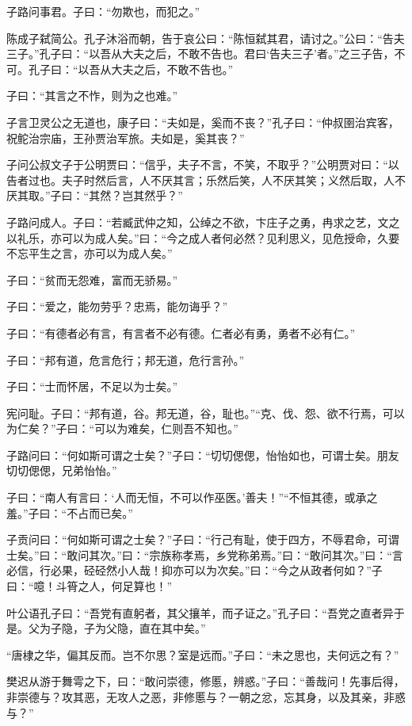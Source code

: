 \documentclass[a5paper]{ctexbook}
\begin{document}
    子路问事君。子曰：“勿欺也，而犯之。”

    陈成子弑简公。孔子沐浴而朝，告于哀公曰：“陈恒弑其君，请讨之。”公曰：“告夫三子。”孔子曰：“以吾从大夫之后，不敢不告也。君曰‘告夫三子’者。”之三子告，不可。孔子曰：“以吾从大夫之后，不敢不告也。”

    子曰：“其言之不怍，则为之也难。”

    子言卫灵公之无道也，康子曰：“夫如是，奚而不丧？”孔子曰：“仲叔圉治宾客，祝𬶍治宗庙，王孙贾治军旅。夫如是，奚其丧？”

    子问公叔文子于公明贾曰：“信乎，夫子不言，不笑，不取乎？”公明贾对曰：“以告者过也。夫子时然后言，人不厌其言；乐然后笑，人不厌其笑；义然后取，人不厌其取。”子曰：“其然？岂其然乎？”

    子路问成人。子曰：“若臧武仲之知，公绰之不欲，卞庄子之勇，冉求之艺，文之以礼乐，亦可以为成人矣。”曰：“今之成人者何必然？见利思义，见危授命，久要不忘平生之言，亦可以为成人矣。”

    子曰：“贫而无怨难，富而无骄易。”

    子曰：“爱之，能勿劳乎？忠焉，能勿诲乎？”

    子曰：“有德者必有言，有言者不必有德。仁者必有勇，勇者不必有仁。”

    子曰：“邦有道，危言危行；邦无道，危行言孙。”

    子曰：“士而怀居，不足以为士矣。”

    宪问耻。子曰：“邦有道，谷。邦无道，谷，耻也。”“克、伐、怨、欲不行焉，可以为仁矣？”子曰：“可以为难矣，仁则吾不知也。”

    子路问曰：“何如斯可谓之士矣？”子曰：“切切偲偲，怡怡如也，可谓士矣。朋友切切偲偲，兄弟怡怡。”

    子曰：“南人有言曰：‘人而无恒，不可以作巫医。’善夫！”“不恒其德，或承之羞。”子曰：“不占而已矣。”

    子贡问曰：“何如斯可谓之士矣？”子曰：“行己有耻，使于四方，不辱君命，可谓士矣。”曰：“敢问其次。”曰：“宗族称孝焉，乡党称弟焉。”曰：“敢问其次。”曰：“言必信，行必果，硁硁然小人哉！抑亦可以为次矣。”曰：“今之从政者何如？”子曰：“噫！斗筲之人，何足算也！”

    叶公语孔子曰：“吾党有直躬者，其父攘羊，而子证之。”孔子曰：“吾党之直者异于是。父为子隐，子为父隐，直在其中矣。”

    “唐棣之华，偏其反而。岂不尔思？室是远而。”子曰：“未之思也，夫何远之有？”

    樊迟从游于舞雩之下，曰：“敢问崇德，修慝，辨惑。”子曰：“善哉问！先事后得，非崇德与？攻其恶，无攻人之恶，非修慝与？一朝之忿，忘其身，以及其亲，非惑与？”
\end{document}
